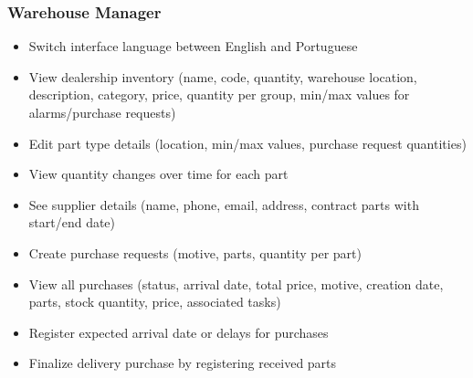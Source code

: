 \subsubsection{Warehouse Manager}
\begin{itemize}
    \item Switch interface language between English and Portuguese
    \item View dealership inventory (name, code, quantity, warehouse location, description, category, price, quantity per group, min/max values for alarms/purchase requests)
    \item Edit part type details (location, min/max values, purchase request quantities)
    \item View quantity changes over time for each part
    \item See supplier details (name, phone, email, address, contract parts with start/end date)
    \item Create purchase requests (motive, parts, quantity per part)
    \item View all purchases (status, arrival date, total price, motive, creation date, parts, stock quantity, price, associated tasks)
    \item Register expected arrival date or delays for purchases
    \item Finalize delivery purchase by registering received parts
\end{itemize}

